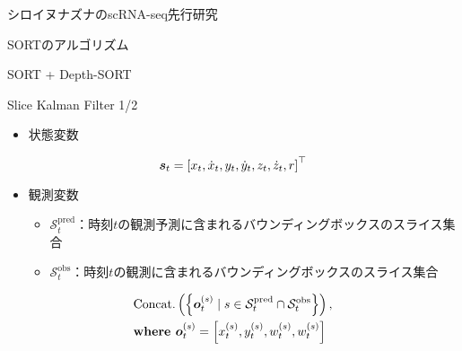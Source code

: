 \begin{frame}[noframenumbering]{シロイヌナズナのscRNA-seq先行研究}
\end{frame}

\begin{frame}[noframenumbering]{SORTのアルゴリズム}
\end{frame}

\begin{frame}[noframenumbering]{SORT + Depth-SORT}
\end{frame}

\begin{frame}[noframenumbering]{Slice Kalman Filter 1/2}
    \begin{itemize}
        \item 状態変数
    \end{itemize}
    \begin{equation}
        \notag
        \bm{s}_t = \left[x_t ,\dot{x}_t, y_t, \dot{y}_t, z_t, \dot{z}_t, r\right]^{\top}
    \end{equation}
    \begin{itemize}
        \item 観測変数
        \begin{itemize}
            \item $\mathcal{S}_t^{\text{pred}}$：時刻$t$の観測予測に含まれるバウンディングボックスのスライス集合
            \item $\mathcal{S}_t^{\text{obs}}$：時刻$t$の観測に含まれるバウンディングボックスのスライス集合
        \end{itemize}
    \end{itemize}
    \vspace{0.5zh}
    \begin{equation}
        \notag
        \begin{aligned}
            &\text{Concat.}\left(\left\{
                \bm{o}_t^{(s)} \mid s \in \mathcal{S}_t^{\text{pred}} \cap \mathcal{S}_t^{\text{obs}}
            \right\}\right),
            \\ & \textbf{where } \bm{o}_t^{(s)} = \left[x_t^{(s)}, y_t^{(s)}, w_t^{(s)}, w_t^{(s)}\right]
        \end{aligned}
    \end{equation}
\end{frame}

